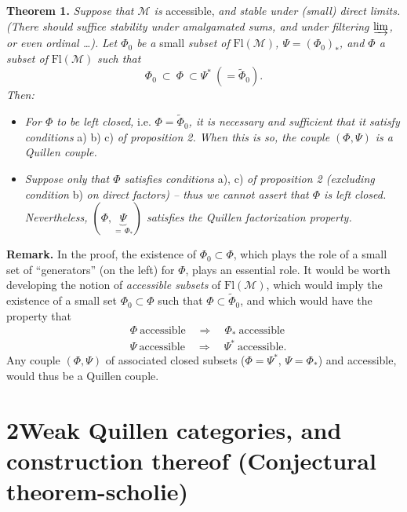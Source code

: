 \documentclass[11pt]{article}
\newcommand{\printedpage}[1]{\marginpar{\footnotesize p.~#1}}
\newcommand{\msp}[1]{\marginpar{\footnotesize [#1]}}
\newcommand{\cM}{\mathcal{M}}
\newcommand{\Fl}{\mathrm{Fl}}
\begin{document}
\setcounter{footnote}{4}

\printedpage{4}
\msp{page 6}\textbf{Theorem 1.} \textit{Suppose that $\cM$ is} accessible, \textit{and stable under (small) direct limits. (There should suffice stability under amalgamated sums, and under filtering $\varinjlim$, or even ordinal \dots).} \textit{Let $\Phi_0$ be a} small \textit{subset of} $\Fl(\cM)$\textit{, $\Psi=(\Phi_0)_*$, and $\Phi$ a subset of} $\Fl(\cM)$ \textit{such that}
\[
\Phi_0\ \subset\ \Phi\ \subset\Psi^*\ (=\widetilde{\Phi}_0).
\]
\textit{Then:}

\begin{itemize}[leftmargin=2.5em]
\item[a)] \textit{For $\Phi$ to be left closed,} i.e. $\Phi=\widetilde{\Phi}_0$\textit{, it is necessary and sufficient that it satisfy conditions} a) b) c) \textit{of proposition 2. When this is so, the couple $(\Phi,\Psi)$ is a Quillen couple.}

\item[b)] \textit{Suppose only that $\Phi$ satisfies conditions} a), c) \textit{of proposition 2 (excluding condition} b) \textit{on direct factors) – thus we cannot assert that $\Phi$ is left closed. Nevertheless, $(\Phi,\underbrace{\Psi}_{=\,\Phi_*})$ satisfies the Quillen factorization property.}
\end{itemize}

\textbf{Remark.} In the proof, the existence of $\Phi_0\subset\Phi$, which plays the role of a small set of ``generators'' (on the left) for $\Phi$, plays an essential role. It would be worth developing the notion of \textit{accessible subsets}
\msp{page 7}
of $\Fl(\cM)$, which would imply the existence of a small set $\Phi_0\subset\Phi$ such that $\Phi\subset\widetilde{\Phi}_0$, and which would have the property that
\[
\begin{aligned}
&\Phi\ \text{accessible}\quad\Longrightarrow\quad\Phi_*\ \text{accessible}\\
&\Psi\ \text{accessible}\quad\Longrightarrow\quad\Psi^*\ \text{accessible.}
\end{aligned}
\]
Any couple $(\Phi,\Psi)$ of associated closed subsets ($\Phi=\Psi^*$, $\Psi=\Phi_*$) and accessible, would thus be a Quillen couple.

\section*{2\quad Weak Quillen categories, and construction thereof (Conjectural theorem-scholie)}
\end{document}
